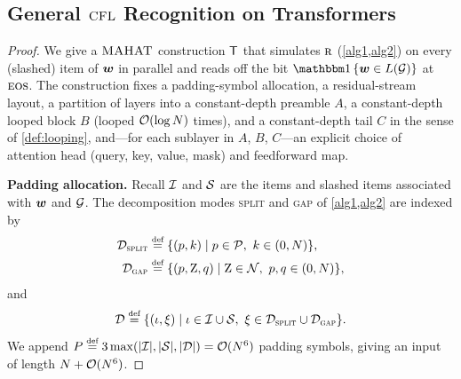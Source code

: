 \documentclass{article}
\begin{document}
\subsection{General ${\textsc{CFL}}$ Recognition on Transformers}\label{app:proofcfl2ahat}
\cfltoahat*
\begin{proof}
    We give a ${{\textsc{MAHAT}}}$ construction $\tf$ that simulates ${\textsc{r}}$ (\cref{alg1,alg2}) on every (slashed) item of ${{\boldsymbol{w}}}$ in parallel and reads off the bit $\ind{\str \in \lang(\grammar)}$ at ${{\textsc{eos}}}$.
    The construction fixes a padding-symbol allocation, a residual-stream layout, a partition of layers into a constant-depth preamble $A$, a constant-depth looped block $B$ (looped ${{ \mathcal{O}}}(\log {{ N}})$ times), and a constant-depth tail $C$ in the sense of \cref{def:looping}, and---for each sublayer in $A$, $B$, $C$---an explicit choice of attention head (query, key, value, mask) and feedforward map.
    
    \textbf{Padding allocation.}
    Recall ${{\mathcal{I}}}$ and ${{\mathcal{S}}}$ are the items and slashed items associated with ${{\boldsymbol{w}}}$ and ${{ \mathcal{G}}}$.
    The decomposition modes \textsc{split} and \textsc{gap} of \cref{alg1,alg2} are indexed by
    \begin{align*}
        \itmsplit & \defeq \set{(\arule, \idxk) \mid \arule \in \rules,\ \idxk \in (0,\idxn)}, \\
        \itmgap   & \defeq \set{(p, \NT{Z}, q) \mid \NT{Z} \in \nonterm,\ p, q \in (0,\idxn)},
    \end{align*}
    and
    \begin{equation*}
        \itmdec \defeq \set{(\itm, \decomp) \mid \itm \in \items \cup \slasheditems,\ \decomp \in \itmsplit \cup \itmgap}.
    \end{equation*}
    We append $\paddingcount \defeq 3\max(|\items|,|\slasheditems|,|\itmdec|) = \bigo(\idxn^6)$ padding symbols, giving an input of length ${{ N}} + {{ \mathcal{O}}}({{ N}}^6)$.
    

\end{proof}
\end{document}
